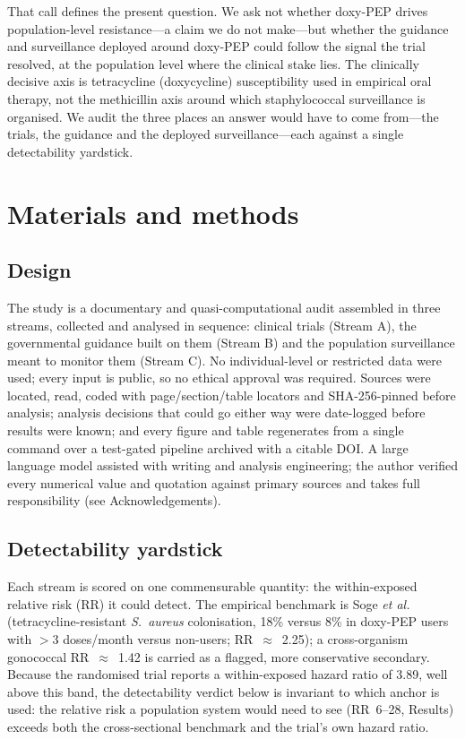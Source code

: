 \documentclass[12pt,a4paper]{article}
\newcommand{\sa}{\emph{S.~aureus}}
\begin{document}
That call defines the present question. We ask not whether doxy-PEP drives
population-level resistance---a claim we do not make---but whether the guidance
and surveillance deployed around doxy-PEP could follow the signal the trial
resolved, at the population level where the clinical stake lies. The clinically
decisive axis is tetracycline (doxycycline) susceptibility used in empirical oral
therapy, not the methicillin axis around which staphylococcal surveillance is
organised. We audit the three places an answer would have to come from---the
trials, the guidance and the deployed surveillance---each against a single
detectability yardstick.

\section*{Materials and methods}

\subsection*{Design}
The study is a documentary and quasi-computational audit assembled in three
streams, collected and analysed in sequence: clinical trials (Stream A), the
governmental guidance built on them (Stream B) and the population surveillance
meant to monitor them (Stream C). No individual-level or restricted data were
used; every input is public, so no ethical approval was required. Sources were
located, read, coded with page/section/table locators and SHA-256-pinned before
analysis; analysis decisions that could go either way were date-logged before
results were known; and every figure and table regenerates from a single command
over a test-gated pipeline archived with a citable
DOI.\cite{armond2024integrity} A large language model assisted with writing and
analysis engineering; the author verified every numerical value and quotation
against primary sources and takes full responsibility (see Acknowledgements).

\subsection*{Detectability yardstick}
Each stream is scored on one commensurable quantity: the within-exposed relative
risk (RR) it could detect. The empirical benchmark is Soge \textit{et
al.}\cite{soge2025} (tetracycline-resistant \sa{} colonisation, 18\% versus 8\%
in doxy-PEP users with $>$3 doses/month versus non-users; RR~$\approx$~2.25); a
cross-organism gonococcal RR~$\approx$~1.42 is carried as a flagged, more
conservative secondary. Because the randomised trial reports a within-exposed
hazard ratio of 3.89, well above this band, the detectability verdict below is
invariant to which anchor is used: the relative risk a population system would
need to see (RR~6--28, Results) exceeds both the cross-sectional benchmark and
the trial's own hazard ratio.
\end{document}
